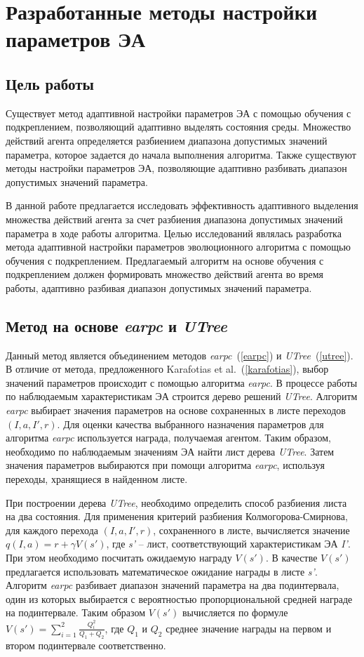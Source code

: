\chapter{Разработанные методы настройки параметров ЭА}
\label{proposed_chapter}
\section{Цель работы}
Существует метод адаптивной настройки параметров ЭА с помощью обучения с подкреплением, позволяющий адаптивно выделять состояния среды. Множество действий агента определяется разбиением диапазона допустимых значений параметра, которое задается до начала выполнения алгоритма. Также существуют методы настройки параметров ЭА, позволяющие адаптивно разбивать диапазон допустимых значений параметра.

В данной работе предлагается исследовать эффективность адаптивного выделения множества действий агента за счет разбиения диапазона допустимых значений параметра в ходе работы алгоритма. Целью исследований являлась разработка метода адаптивной настройки параметров эволюционного алгоритма с помощью обучения с подкреплением. Предлагаемый алгоритм на основе обучения с подкреплением должен формировать множество действий агента во время работы, адаптивно разбивая диапазон допустимых значений параметра.

\section{Метод на основе \textit{earpc} и \textit{UTree}}
\label{composing_method}
Данный метод является объединением методов \textit{earpc}~(\ref{earpc}) и \textit{UTree}~(\ref{utree}). В отличие от метода, предложенного Karafotias et al.~(\ref{karafotias}), выбор значений параметров происходит с помощью алгоритма \textit{earpc}. В процессе работы по наблюдаемым характеристикам ЭА строится дерево решений \textit{UTree}. Алгоритм \textit{earpc} выбирает значения параметров на основе сохраненных в листе переходов $(I, a, I', r)$. Для оценки качества выбранного назначения параметров для алгоритма \textit{earpc} используется награда, получаемая агентом. Таким образом, необходимо по наблюдаемым значениям ЭА найти лист дерева \textit{UTree}. Затем значения параметров выбираются при помощи алгоритма \textit{earpc}, используя переходы, хранящиеся в найденном листе.

При построении дерева \textit{UTree}, необходимо определить способ разбиения листа на два состояния. Для применения критерий разбиения Колмогорова-Смирнова, для каждого перехода $(I, a, I', r)$, сохраненного в листе, вычисляется значение $q(I, a) = r + \gamma V(s')$, где \textit{s'} -- лист, соответствующий характеристикам ЭА \textit{I'}. При этом необходимо посчитать ожидаемую награду $V(s')$. В качестве $V(s')$ предлагается использовать математическое ожидание награды в листе \textit{s'}. Алгоритм \textit{earpc} разбивает диапазон значений параметра на два подинтервала, один из которых выбирается с вероятностью пропорциональной средней награде на подинтервале. Таким образом $V(s')$ вычисляется по формуле $V(s') = \sum\limits_{i = 1}^2{\frac{Q_i^2}{Q_1 + Q_2}}$, где $Q_1$ и $Q_2$ среднее значение награды на первом и втором подинтервале соответственно. 

